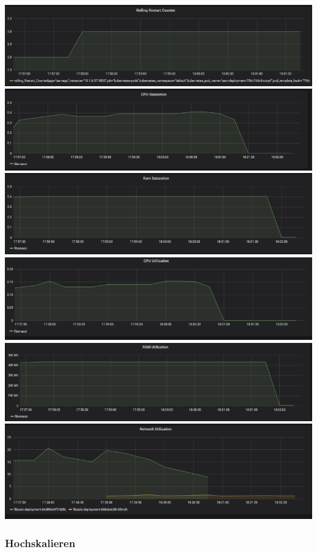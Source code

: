 \documentclass[a4paper,10pt]{scrartcl}
\begin{document}
\begin{description}
\begin{minipage}{\linewidth}
            \includegraphics[width=.5\textwidth]{img/RAMCPUAnomalie/RollingRestart.PNG}
            \includegraphics[scale=1,width=.5\textwidth,height=.14\textheight]{img/RAMCPUAnomalie/CPUSaturation.PNG}
            \includegraphics[scale=1,width=.5\textwidth,height=.14\textheight]{img/RAMCPUAnomalie/RAMSaturation.PNG}
  			\includegraphics[scale=1,width=.5\textwidth]{img/RAMCPUAnomalie/CPUUtilization.PNG}
  			\includegraphics[scale=1,width=.5\textwidth]{img/RAMCPUAnomalie/RAMUtilization.PNG}
  			\includegraphics[scale=1,width=.5\textwidth]{img/RAMCPUAnomalie/Netzwerk.PNG}
\end{minipage}

\end{description}

\pagebreak

\subsubsection{Hochskalieren}
\end{document}
